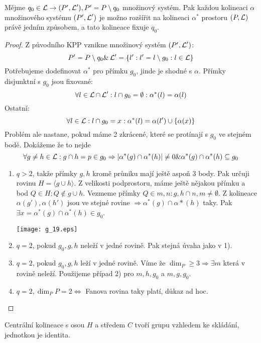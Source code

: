 \begin{lemma}\label{kpp:extension}
    Mějme $q_0\in\operatorname{\mathcal{L}}\rightarrow (P',\operatorname{\mathcal{L}}'), P' = P\setminus q_0$ množinový systém.
    Pak každou kolineaci $\alpha$ množinového systému $(P',\operatorname{\mathcal{L}}')$ je možno rozšířit na kolineaci $\alpha^*$ prostoru $(P, \operatorname{\mathcal{L}})$ právě jedním způsobem, a tato kolineace fixuje $q_0$.
\end{lemma}
\begin{proof}
	Z původního KPP vznikne množinový systém $(P',\operatorname{\mathcal{L}}')$:
	\[ P' = P\setminus q_0 \& \operatorname{\mathcal{L}}' = \{ l': l' = l \setminus g_0: l \in \operatorname{\mathcal{L}} \} \]
	Potřebujeme dodefinovat $\alpha^*$ pro přímku $g_0$, jinde je shodné s $\alpha$.
	Přímky disjunktní s $g_0$ jsou fixované:
	\[ \forall l \in \operatorname{\mathcal{L}} \cap \operatorname{\mathcal{L}}': l \cap g_0 = \emptyset: \alpha^*(l) = \alpha(l) \]
	Ostatní:
	\[ \forall l \in \operatorname{\mathcal{L}}: l \cap g_0 = x: \alpha^*(l) = \alpha(l') \cup \{ \alpha(x) \} \]
	Problém ale nastane, pokud máme 2 zkrácené, které se protínají s $g_0$ ve stejném bodě.
	Dokážeme že to nejde
	\[ \forall g \ne h \in \operatorname{\mathcal{L}}: g \cap h = p \in g_0 \Rightarrow |\alpha^*(g) \cap \alpha^*(h)| \ne 0 \& \alpha^*(g) \cap \alpha^*(h) \subseteq g_0 \]
    \begin{enumerate}
	    \item $q > 2$, takže přímky $g, h$ kromě průniku mají ještě aspoň 3 body.
		    Pak určuji rovinu $H = \langle g \cup h \rangle$.
		    Z velikosti podprostoru, máme ještě nějakou přímku a bod $Q \in H: Q \notin g \cup h$.
		    Vezmeme přímky $Q \in m, n: g,h \cap n,m \ne \emptyset$.
		    Z kolineace $\alpha(g'), \alpha(h')$ jsou ve stejné rovine $\Rightarrow \alpha^*(g) \cap \alpha*(h)$ taky.
		    Pak $\exists x = \alpha^*(g) \cap \alpha^*(h) \in g_0$.

    	\texttt{[image: g\_19.eps]}

	\item $q = 2$, pokud $g_0, g, h$ neleží v jedné rovině.
		Pak stejná úvaha jako v 1).

	\item $q = 2$, pokud $g_0, g, h$ leží v jedné rovině.
		Víme že $\dim_P \geq 3 \Rightarrow \exists m$ která v rovině neleží.
		Použijeme případ 2) pro $m, h, g_0$ a $m, g, g_0$.
	\item $q = 2, \dim_P P = 2 \iff$ Fanova rovina taky platí, důkaz ad hoc.
    \end{enumerate}
\end{proof}

\begin{lemma}
    Centrální kolineace s osou $H$ a středem $C$ tvoří grupu vzhledem ke skládání, jednotkou je identita.
\end{lemma}

